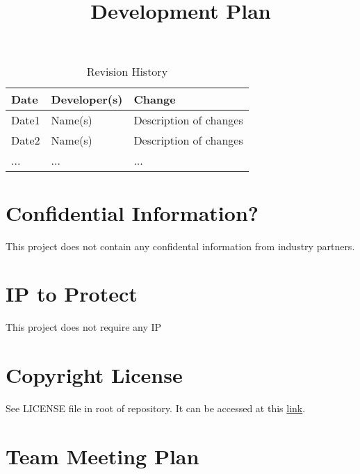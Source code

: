 \documentclass{article}
\title{Development Plan\\\progname}
\author{\authname}
\date{}
\begin{document}
\maketitle

\begin{table}[hp]
\caption{Revision History} \label{TblRevisionHistory}
\begin{tabularx}{\textwidth}{llX}
\toprule
\textbf{Date} & \textbf{Developer(s)} & \textbf{Change}\\
\midrule
Date1 & Name(s) & Description of changes\\
Date2 & Name(s) & Description of changes\\
... & ... & ...\\
\bottomrule
\end{tabularx}
\end{table}

\newpage{}



\section{Confidential Information?}

This project does not contain any confidental information from industry partners.

\section{IP to Protect} 

This project does not require any IP

\section{Copyright License}

See LICENSE file in root of repository. It can be accessed at this
\href{https://github.com/hitchly/hitchly/blob/main/LICENSE}{link}.

\section{Team Meeting Plan}
\end{document}
